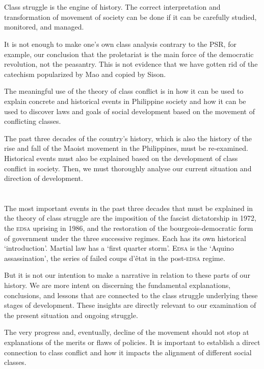 \documentclass[a4paper,11pt,onesided]{report}
\begin{document}
\section{}
Class struggle is the engine of history. 
The correct interpretation and transformation of movement of society
can be done if it can be carefully studied, monitored, and managed.

It is not enough to make one's own class analysis contrary to the PSR,
for example, our conclusion that the proletariat is 
the main force of the democratic revolution, not the peasantry. 
This is not evidence that we have gotten rid 
of the catechism popularized by Mao and copied by Sison.

The meaningful use of the theory of class conflict 
is in how it can be used to explain 
concrete and historical events 
in Philippine society 
and how it can be used to discover laws and goals 
of social development based on the movement of conflicting classes.

The past three decades of the country's history,
which is also the history of the rise and fall of 
the Maoist movement in the Philippines,
must be re-examined. 
Historical events must also be explained based on the development 
of class conflict in society. 
Then,  we must thoroughly analyse our current situation 
and direction of development.

\section{}
The most important events in the past three decades that must be explained 
in the theory of class struggle are 
the imposition of the fascist dictatorship in 1972, 
the \textsc{edsa} uprising in 1986, 
and the restoration of the bourgeois-democratic form of government 
under the three successive regimes. 
Each has its own historical `introduction'. 
Martial law has a `first quarter storm'. 
\textsc{Edsa} is the `Aquino assassination', 
the series of failed coups d'êtat in the post-\textsc{edsa} regime.

But it is not our intention to make a narrative in relation 
to these parts of our history. 
We are more intent on 
discerning the fundamental explanations, conclusions, and lessons 
that are connected to the class struggle 
underlying these stages of development. 
These insights are directly relevant 
to our examination of the present situation and ongoing struggle.

The very progress and, eventually, decline of the movement 
should not stop at explanations of 
the merits or flaws of policies. 
It is important to establish 
a direct connection to class conflict 
and how it impacts the alignment of different social classes.
\end{document}
